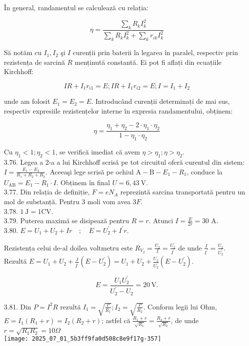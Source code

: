 În general, randamentul se calculează cu relația:

$$
\eta=\frac{\sum_{k} R_{k} I_{k}^{2}}{\sum_{k} R_{k} I_{k}^{2}+\sum_{k} r_{i k} I_{k}^{2}}
$$

Să notăm cu $I_{1}, I_{2}$ şi $I$ curenții prin baterii la legarea în paralel, respectiv prin rezistența de sarcină $R$ menținută constantă. Ei pot fi aflați din ecuațiile Kirchhoff:

$$
I R+I_{1} r_{i 1}=E ; I R+I_{1} r_{i 2}=E ; I=I_{1}+I_{2}
$$

unde am folosit $E_{1}=E_{2}=E$. Introducând curenții determinați de mai sus, respectiv expresiile rezistențelor interne în expresia randamentului, obținem:

$$
\eta=\frac{\eta_{1}+\eta_{2}-2 \cdot \eta_{1} \cdot \eta_{2}}{1-\eta_{1} \cdot \eta_{2}}
$$

Cu $\eta_{1}<1 ; \eta_{2}<1$, se verifică imediat că avem $\eta>\eta_{1} ; \eta>\eta_{2}$.\\
3.76. Legea a 2-a a lui Kirchhoff scrisă pe tot circuitul oferă curentul din sistem: $I=\frac{E_{1}-E_{2}}{R_{1}+R_{2}+R_{3}}$. Aceeaşi lege scrisă pe ochiul $\mathrm{A}-\mathrm{B}-E_{1}-R_{1}$, conduce la $U_{\mathrm{AB}}=E_{1}-R_{1} \cdot I$. Obținem în final $U=6,43 \mathrm{~V}$.\\
3.77. Din relația de definiție, $F=e N_{A}$ reprezintă sarcina transportată pentru un mol de substanță. Pentru 3 moli vom avea $3 F$.\\
3.78. $1 \mathrm{~J}=1 \mathrm{CV}$.\\
3.79. Puterea maximă se disipează pentru $R=r$. Atunci $I=\frac{E}{2 r}=30$ A.\\
3.80. $E=U_{1}+U_{2}+I r \quad ; \quad E=U_{2}^{\prime}+I^{\prime} r$.

Rezistența celui de-al doilea voltmetru este $R_{V_{2}}=\frac{U_{2}}{I}=\frac{U_{2}^{\prime}}{I^{\prime}}$ de unde $\frac{I}{I^{\prime}}=\frac{U_{2}}{U_{2}^{\prime}}$. Rezultă $E=U_{1}+U_{2}+\frac{I}{I^{\prime}}\left(E-U_{2}^{\prime}\right)=U_{1}+U_{2}+\frac{U_{2}}{U_{2}^{\prime}}\left(E-U_{2}^{\prime}\right)$.

$$
E=\frac{U_{1} U_{2}^{\prime}}{U_{2}^{\prime}-U_{2}}=20 \mathrm{~V} .
$$

3.81. Din $P=I^{2} R$ rezultă $I_{1}=\sqrt{\frac{P}{R_{1}}} ; I_{2}=\sqrt{\frac{P}{R_{2}}}$. Conform legii lui Ohm, $E=I_{1}\left(R_{1}+r\right)=I_{2}\left(R_{2}+r\right)$; astfel că $\frac{R_{1}+r}{\sqrt{R_{1}}}=\frac{R_{2}+r}{\sqrt{R_{2}}}$, de unde $r=\sqrt{R_{1} R_{2}}=10 \Omega$\\
\texttt{[image: 2025\_07\_01\_5b3ff9fa0d508c8e9f17g-357]}

